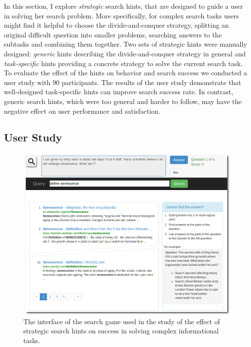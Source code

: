 In this section, I explore \textit{strategic} search hints, that are designed to guide a user in solving her search problem.
More specifically, for complex search tasks users might find it helpful to choose the divide-and-conquer strategy, \ie splitting an original difficult question into smaller problems, searching answers to the subtasks and combining them together.
Two sets of strategic hints were manually designed: \textit{generic} hints describing the divide-and-conquer strategy in general and \textit{task-specific} hints providing a concrete strategy to solve the current search task.
To evaluate the effect of the hints on behavior and search success we conducted a user study with 90 participants.
The results of the user study demonstrate that well-designed task-specific hints can improve search success rate.
In contrast, generic search hints, which were too general and harder to follow, may have the negative effect on user performance and satisfaction.

\subsection{User Study}
\label{section:conversation:hints:user-study}

\begin{figure}[t]
\centering
\includegraphics[width=\textwidth]{img/hints_ufindit}
\caption{The interface of the search game used in the study of the effect of strategic search hints on success in solving complex informational tasks.}
\label{figure:conversation:hints:ufindit}
\end{figure}

